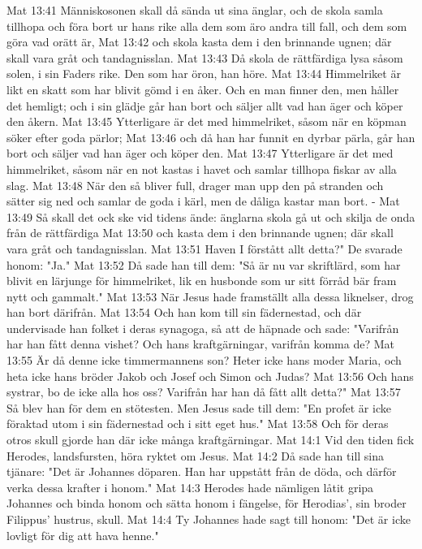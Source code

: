 Mat 13:41  Människosonen skall då sända ut sina änglar, och de skola samla tillhopa och föra bort ur hans rike alla dem som äro andra till fall, och dem som göra vad orätt är,
Mat 13:42  och skola kasta dem i den brinnande ugnen; där skall vara gråt och tandagnisslan.
Mat 13:43  Då skola de rättfärdiga lysa såsom solen, i sin Faders rike. Den som har öron, han höre.
Mat 13:44  Himmelriket är likt en skatt som har blivit gömd i en åker. Och en man finner den, men håller det hemligt; och i sin glädje går han bort och säljer allt vad han äger och köper den åkern.
Mat 13:45  Ytterligare är det med himmelriket, såsom när en köpman söker efter goda pärlor;
Mat 13:46  och då han har funnit en dyrbar pärla, går han bort och säljer vad han äger och köper den.
Mat 13:47  Ytterligare är det med himmelriket, såsom när en not kastas i havet och samlar tillhopa fiskar av alla slag.
Mat 13:48  När den så bliver full, drager man upp den på stranden och sätter sig ned och samlar de goda i kärl, men de dåliga kastar man bort. -
Mat 13:49  Så skall det ock ske vid tidens ände: änglarna skola gå ut och skilja de onda från de rättfärdiga
Mat 13:50  och kasta dem i den brinnande ugnen; där skall vara gråt och tandagnisslan.
Mat 13:51  Haven I förstått allt detta?" De svarade honom: "Ja."
Mat 13:52  Då sade han till dem: "Så är nu var skriftlärd, som har blivit en lärjunge för himmelriket, lik en husbonde som ur sitt förråd bär fram nytt och gammalt."
Mat 13:53  När Jesus hade framställt alla dessa liknelser, drog han bort därifrån.
Mat 13:54  Och han kom till sin fädernestad, och där undervisade han folket i deras synagoga, så att de häpnade och sade: "Varifrån har han fått denna vishet? Och hans kraftgärningar, varifrån komma de?
Mat 13:55  Är då denne icke timmermannens son? Heter icke hans moder Maria, och heta icke hans bröder Jakob och Josef och Simon och Judas?
Mat 13:56  Och hans systrar, bo de icke alla hos oss? Varifrån har han då fått allt detta?"
Mat 13:57  Så blev han för dem en stötesten. Men Jesus sade till dem: "En profet är icke föraktad utom i sin fädernestad och i sitt eget hus."
Mat 13:58  Och för deras otros skull gjorde han där icke många kraftgärningar.
Mat 14:1  Vid den tiden fick Herodes, landsfursten, höra ryktet om Jesus.
Mat 14:2  Då sade han till sina tjänare: "Det är Johannes döparen. Han har uppstått från de döda, och därför verka dessa krafter i honom."
Mat 14:3  Herodes hade nämligen låtit gripa Johannes och binda honom och sätta honom i fängelse, för Herodias', sin broder Filippus' hustrus, skull.
Mat 14:4  Ty Johannes hade sagt till honom: "Det är icke lovligt för dig att hava henne."
